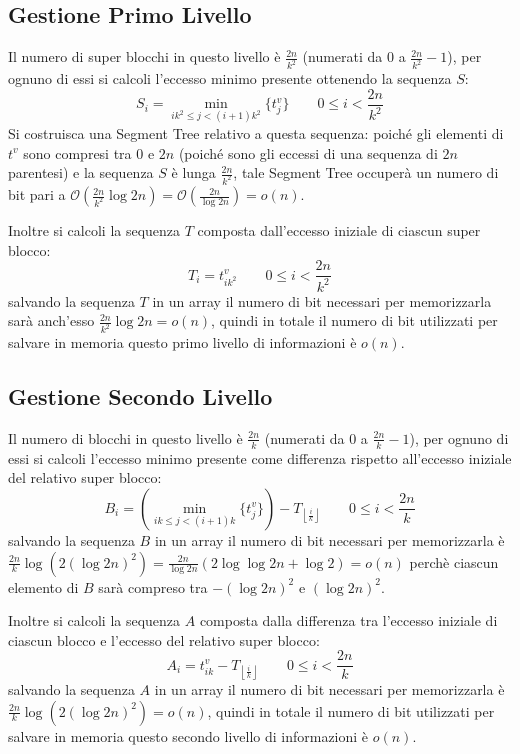 \documentclass{article}
\begin{document}
\subsection{Gestione Primo Livello}
Il numero di super blocchi in questo livello è $\frac{2n}{k^2}$ (numerati da $0$ a $\frac{2n}{k^2}-1$), per ognuno di essi si calcoli l'eccesso minimo presente ottenendo la sequenza $S$:
    $$
    S_i = \min_{ik^2 \leq j < (i+1)k^2}\{t^v_j\} \qquad 0\leq i < \frac{2n}{k^2}
    $$
Si costruisca una Segment Tree relativo a questa sequenza: poiché gli elementi di $t^v$ sono compresi tra $0$ e $2n$ (poiché sono gli eccessi di una sequenza di $2n$ parentesi) e la sequenza $S$ è lunga $\frac{2n}{k^2}$, tale Segment Tree occuperà un numero di bit pari a $\mathcal{O}(\frac{2n}{k^2}\log{2n})=\mathcal{O}(\frac{2n}{\log{2n}})=o(n)$.

Inoltre si calcoli la sequenza $T$ composta dall'eccesso iniziale di ciascun super blocco:
    $$
    T_i = t^v_{ik^2} \qquad 0\leq i < \frac{2n}{k^2}
    $$
salvando la sequenza $T$ in un array il numero di bit necessari per memorizzarla sarà anch'esso $\frac{2n}{k^2}\log{2n}=o(n)$, quindi in totale il numero di bit utilizzati per salvare in memoria questo primo livello di informazioni è $o(n)$.

\subsection{Gestione Secondo Livello}
Il numero di blocchi in questo livello è $\frac{2n}{k}$ (numerati da $0$ a $\frac{2n}{k}-1$), per ognuno di essi si calcoli l'eccesso minimo presente come differenza rispetto all'eccesso iniziale del relativo super blocco:
    $$
    B_i = \left(\min_{ik \leq j < (i+1)k}\{t^v_j\}\right)-T_{\left\lfloor{\frac{i}{k}}\right\rfloor} \qquad 0\leq i < \frac{2n}{k}
    $$
salvando la sequenza $B$ in un array il numero di bit necessari per memorizzarla è $\frac{2n}{k}\log{(2(\log{2n})^2)}=\frac{2n}{\log{2n}}(2\log{\log{2n}}+\log{2})=o(n)$ perchè ciascun elemento di $B$ sarà compreso tra $-(\log{2n})^2$ e $(\log{2n})^2$.

Inoltre si calcoli la sequenza $A$ composta dalla differenza tra l'eccesso iniziale di ciascun blocco e l'eccesso del relativo super blocco:
    $$
    A_i = t^v_{ik}-T_{\left\lfloor{\frac{i}{k}}\right\rfloor} \qquad 0\leq i < \frac{2n}{k}
    $$
salvando la sequenza $A$ in un array il numero di bit necessari per memorizzarla è $\frac{2n}{k}\log{(2(\log{2n})^2)}=o(n)$, quindi in totale il numero di bit utilizzati per salvare in memoria questo secondo livello di informazioni è $o(n)$.
\end{document}
